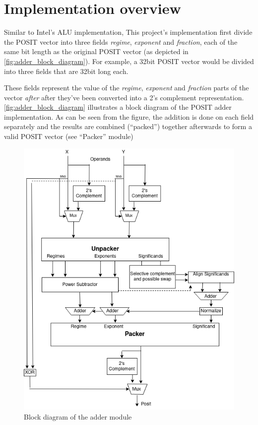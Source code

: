 \documentclass[10pt]{article}
\begin{document}
\section{Implementation overview}\label{sec:impl-overv}

Similar to Intel's ALU implementation, This project's implementation first
divide the POSIT vector into three fields \textit{regime}, \textit{exponent} and
\textit{fraction}, each of the same bit length as the original POSIT vector (as
depicted in \autoref{fig:adder_block_diagram}). For example, a 32bit POSIT
vector would be divided into three fields that are 32bit long each.

These fields represent the value of the \textit{regime}, \textit{exponent} and
\textit{fraction} parts of the vector \emph{after} after they've been converted
into a 2's complement representation. \autoref{fig:adder_block_diagram}
illustrates a block diagram of the POSIT adder implementation. As can be seen
from the figure, the addition is done on each field separately and the results
are combined (``packed'') together afterwards to form a valid POSIT vector (see
``Packer'' module)

\begin{figure}[h]
  \centering
  \includegraphics[width=\textwidth, height=0.4\paperheight]{adder_block_diagram}
  \caption{Block diagram of the adder module}
  \label{fig:adder_block_diagram}
\end{figure}
\end{document}
